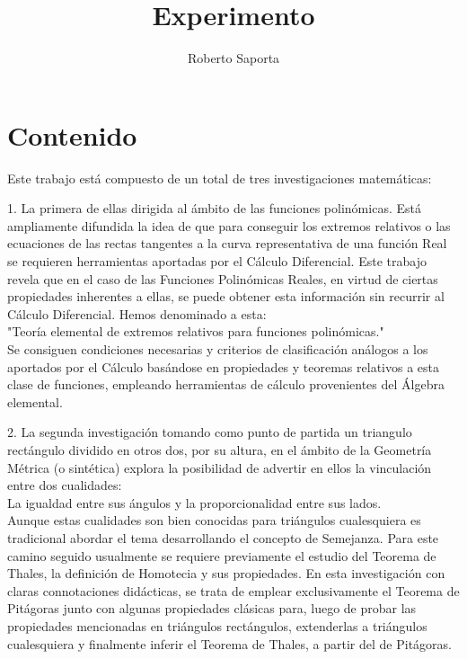 \documentclass[12pt]{article}
\begin{document}
\title{Experimento}
\author{Roberto Saporta}
\date{}



\section*{Contenido}



Este trabajo está compuesto de un total de tres investigaciones matemáticas:

1. La primera de ellas dirigida al ámbito de las funciones polinómicas. Está ampliamente difundida la idea de que para conseguir los extremos relativos o las ecuaciones de las rectas tangentes a la curva representativa de una función Real se requieren herramientas aportadas por el Cálculo Diferencial. Este trabajo revela que en el caso de las Funciones Polinómicas Reales, en virtud de ciertas propiedades inherentes a ellas, se puede obtener esta información sin recurrir al Cálculo Diferencial. Hemos denominado a esta: \\
"Teoría elemental de extremos relativos para funciones polinómicas." \\
Se consiguen condiciones necesarias y criterios de clasificación análogos a los aportados por el Cálculo basándose en propiedades y teoremas relativos a esta clase de funciones, empleando herramientas de cálculo provenientes del Álgebra elemental.

2. La segunda investigación tomando como punto de partida un triangulo rectángulo dividido en otros dos, por su altura, en el ámbito de la Geometría Métrica (o sintética) explora la posibilidad de advertir en ellos la vinculación entre dos cualidades: \\
La igualdad entre sus ángulos y la proporcionalidad entre sus lados. \\
Aunque estas cualidades son bien conocidas para triángulos cualesquiera es tradicional abordar el tema desarrollando el concepto de Semejanza. Para este camino seguido usualmente se requiere previamente el estudio del Teorema de Thales, la definición de Homotecia y sus propiedades.
En esta investigación con claras connotaciones didácticas, se trata de emplear exclusivamente el Teorema de Pitágoras junto con algunas propiedades clásicas para, luego de probar las propiedades mencionadas en triángulos rectángulos, extenderlas a triángulos cualesquiera y finalmente inferir el Teorema de Thales, a partir del de Pitágoras.
\end{document}
